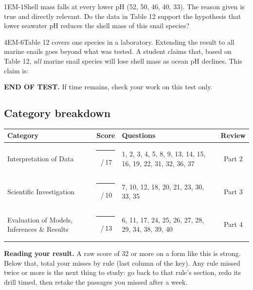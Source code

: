 \documentclass[11pt]{article}
\begin{document}
\begin{q}{1}{EM-1}{Shell mass falls at every lower pH (52, 50, 46, 40, 33). The reason given is true and directly relevant.}
Do the data in Table 12 support the hypothesis that lower seawater pH reduces the shell mass of this snail species?
\end{q}

\begin{q}{4}{EM-6}{Table 12 covers one species in a laboratory. Extending the result to all marine snails goes beyond what was tested.}
A student claims that, based on Table 12, \emph{all} marine snail species will lose shell mass as ocean pH declines. This claim is:
\end{q}

\vspace{1ex}
\begin{center}\small\textbf{END OF TEST.} \quad If time remains, check your work on this test only.\end{center}

\makekey

\subsection*{Category breakdown}
\small
\begin{tabularx}{\linewidth}{@{}l c X c@{}}
\toprule
Category & Score & Questions & Review\\\midrule
Interpretation of Data & \rule{0.8cm}{0.4pt}\,/\,17 & 1, 2, 3, 4, 5, 8, 9, 13, 14, 15, 16, 19, 22, 31, 32, 36, 37 & Part 2\\
Scientific Investigation & \rule{0.8cm}{0.4pt}\,/\,10 & 7, 10, 12, 18, 20, 21, 23, 30, 33, 35 & Part 3\\
Evaluation of Models, Inferences \& Results & \rule{0.8cm}{0.4pt}\,/\,13 & 6, 11, 17, 24, 25, 26, 27, 28, 29, 34, 38, 39, 40 & Part 4\\
\bottomrule
\end{tabularx}

\vspace{1ex}
\textbf{Reading your result.} A raw score of 32 or more on a form like this is strong. Below that, total your misses by rule (last column of the key). Any rule missed twice or more is the next thing to study: go back to that rule's section, redo its drill timed, then retake the passages you missed after a week.
\end{document}
